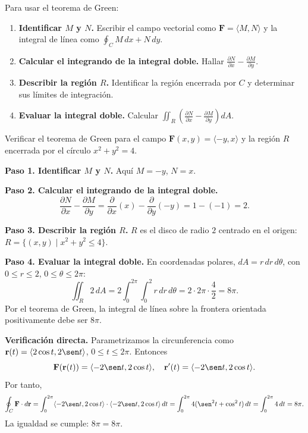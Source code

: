 \begin{pasos}
Para usar el teorema de Green:
\begin{enumerate}
    \item \textbf{Identificar $M$ y $N$.} Escribir el campo vectorial
    como $\mathbf{F}=\langle M,N \rangle$ y la integral de línea como
    $\oint_C M\,dx + N\,dy$.
    \item \textbf{Calcular el integrando de la integral doble.}
    Hallar $\displaystyle \frac{\partial N}{\partial x} -
    \frac{\partial M}{\partial y}$.
    \item \textbf{Describir la región $R$.} Identificar la región
    encerrada por $C$ y determinar sus límites de integración.
    \item \textbf{Evaluar la integral doble.} Calcular
    $\displaystyle \iint_R \left( \frac{\partial N}{\partial x} -
    \frac{\partial M}{\partial y} \right) dA$.
\end{enumerate}
\end{pasos}

\begin{example}
Verificar el teorema de Green para el campo $\mathbf{F}(x,y) =
\langle -y, x \rangle$ y la región $R$ encerrada por el círculo
$x^2+y^2=4$.
\begin{myproof}
\textbf{Paso 1. Identificar $M$ y $N$.}
Aquí $M=-y$, $N=x$.

\textbf{Paso 2. Calcular el integrando de la integral doble.}
\[
\frac{\partial N}{\partial x} - \frac{\partial M}{\partial y}
= \frac{\partial}{\partial x}(x) - \frac{\partial}{\partial y}(-y)
= 1 - (-1) = 2.
\]

\textbf{Paso 3. Describir la región $R$.}
$R$ es el disco de radio $2$ centrado en el origen:
$R = \{(x,y) \mid x^2+y^2 \le 4\}$.

\textbf{Paso 4. Evaluar la integral doble.}
En coordenadas polares, $dA = r\,dr\,d\theta$, con $0 \le r \le 2$,
$0 \le \theta \le 2\pi$:
\[
\iint_R 2\,dA = 2 \int_0^{2\pi} \int_0^2 r\,dr\,d\theta
= 2 \cdot 2\pi \cdot \frac{4}{2} = 8\pi.
\]
Por el teorema de Green, la integral de línea sobre la frontera
orientada positivamente debe ser $8\pi$.

\textbf{Verificación directa.}
Parametrizamos la circunferencia como $\mathbf{r}(t)=\langle 2\cos t,
2\sen t \rangle$, $0 \le t \le 2\pi$. Entonces
\[
\mathbf{F}(\mathbf{r}(t)) = \langle -2\sen t, 2\cos t \rangle,
\quad \mathbf{r}'(t) = \langle -2\sen t, 2\cos t \rangle.
\]
Por tanto,
\[
\oint_C \mathbf{F}\cdot d\mathbf{r}
= \int_0^{2\pi} \langle -2\sen t, 2\cos t \rangle \cdot
\langle -2\sen t, 2\cos t \rangle \, dt
= \int_0^{2\pi} 4(\sen^2 t + \cos^2 t)\,dt
= \int_0^{2\pi} 4\,dt = 8\pi.
\]
La igualdad se cumple: $\boxed{8\pi = 8\pi}$.
\end{myproof}
\end{example}

